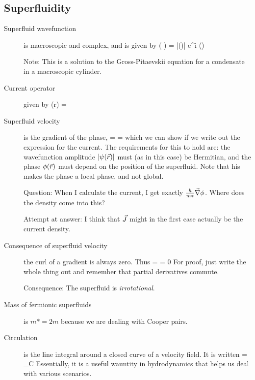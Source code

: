 \subsection{Superfluidity}
\begin{description}
\item[Superfluid wavefunction] is macroscopic and complex, and is given by 
\beq
\psi( ) = |\psi()| e^{i \phi()}
\eeq

Note: This is a solution to the Gross-Pitaevskii equation for a condensate in a macroscopic cylinder. 

\item[Current operator] given by 
\beq
{}(r) =  
\eeq

\item[Superfluid velocity] is the gradient of the phase, 
\beq
{} =  =  \vv{\nabla} \phi
\eeq
which we can show if we write out the expression for the current. The requirements for this to hold are: the wavefunction amplitude $|\psi(\vec{r})|$ must (as in this case) be Hermitian, and the phase $\phi(\vec{r})$ must depend on the position of the superfluid. Note that his makes the phase a local phase, and not global. 

Question: When I calculate the current, I get exactly $\frac{\hbar}{m*} \vec{\nabla} \phi$. Where does the density come into this? 

Attempt at answer: I think that $\vec{J}$ might in the first case actually be the current density. 

\item[Consequence of superfluid velocity] the curl of a gradient is always zero. Thus
\beq
\vv{\nabla} \times {} = \vv{\nabla} \times {} \vv{\nabla} \phi = 0
\eeq
For proof, just write the whole thing out and remember that partial derivatives commute. 

Consequence: The superfluid is \emph{irrotational}. 

\item[Mass of fermionic superfluids] is $m* = 2m$ because we are dealing with Cooper pairs. 

\item[Circulation] is the line integral around a closed curve of a velocity field. It is written
\beq
\Gamma = \oint_C  \cdot \intd {}
\eeq
Essentially, it is a useful wauntity in hydrodynamics that helps us deal with various scenarios. 



\end{description}
